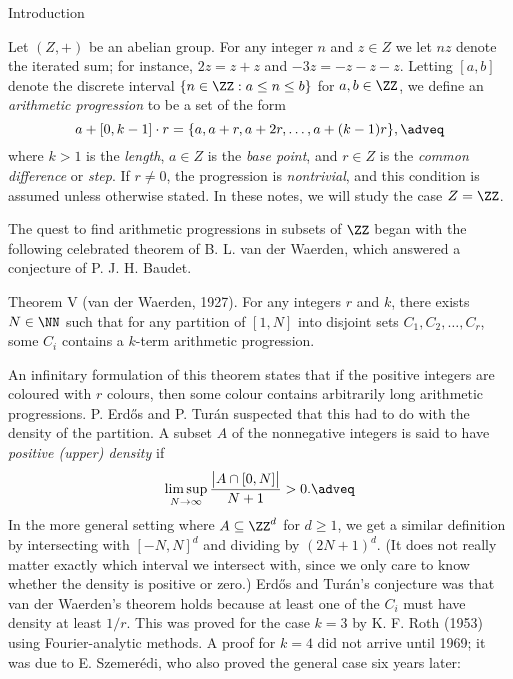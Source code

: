 


\def\F{{\cal F}}

\classicmode


\advsect Introduction

Let $(Z,+)$ be an abelian group. For any integer $n$ and $z\in Z$ we let $nz$ denote the iterated sum; for
instance, $2z = z+z$ and $-3z = -z-z-z$.
Letting $[a,b]$ denote the discrete interval $\{n\in \ZZ:a\leq n\leq b\}$
for $a,b\in \ZZ$, we define an {\it arithmetic progression} to be a set of the form
$$a+[0,k-1]\cdot r = \{a,a+r,a+2r,\ldots,a+(k-1)r\},\adveq$$
where $k>1$ is the {\it length}, $a\in Z$ is the {\it base point}, and $r\in Z$ is the {\it common difference}
or {\it step}. If $r\neq 0$, the progression is {\it nontrivial}, and this condition is assumed unless otherwise
stated. In these notes, we will study the case $Z = \ZZ$.

The quest to find arithmetic progressions in subsets of $\ZZ$ began with the following celebrated theorem
of B. L. van der Waerden, which answered a conjecture of P. J. H. Baudet.

\parenproclaim Theorem V (van der Waerden, {\rm 1927}). For any integers $r$ and $k$, there exists $N\in \NN$
such that for any partition of $[1,N]$ into disjoint sets $C_1, C_2, \ldots, C_r$, some $C_i$ contains
a $k$-term arithmetic progression.\slug

\noindent
An infinitary formulation of this theorem states that if the positive integers are coloured with $r$ colours,
then some colour contains arbitrarily long arithmetic progressions. P. Erd\H os and P. Tur\'an suspected that
this had to do with the density of the partition. A subset $A$ of the nonnegative integers is said to have
{\it positive (upper) density} if
$$\limsup_{N\to \infty} {\big|A\cap [0,N]\big|\over N+1} > 0.\adveq$$
In the more general setting where $A\subseteq \ZZ^d$ for $d\geq 1$, we get a similar definition by intersecting
with $[-N,N]^d$ and dividing by $(2N+1)^d$. (It does not really matter exactly which interval we intersect
with, since we only care to know whether the density is positive or zero.)
Erd\H os and Tur\'an's conjecture was that van der Waerden's
theorem holds because at least one of the $C_i$ must have density at least $1/r$. This was proved for the case $k=3$
by K. F. Roth (1953) using Fourier-analytic methods. A proof for $k=4$ did not arrive until 1969;
it was due to E. Szemer\'edi, who also proved the general case six years later:

